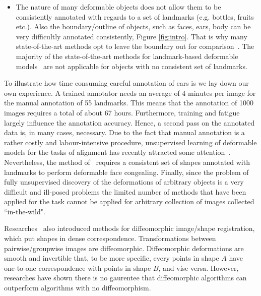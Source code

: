 \begin{itemize}
\item The nature of many deformable objects does not allow them to be consistently annotated with regards to a set of landmarks (e.g. bottles, fruits etc.). Also the boundary/outline of objects, such as faces, ears, body can be very difficultly annotated consistently, Figure \ref{fig:intro}. That is why many state-of-the-art methods opt to leave the boundary out for comparison~\cite{Tzimiropoulos2014, Asthana2014}. The majority of the state-of-the-art methods for landmark-based deformable models~\cite{Cao2012, Zhu2012, Xiong2013, Tzimiropoulos2014, Asthana2014} are not applicable for objects with no consistent set of landmarks. 

\end{itemize}

To illustrate how time consuming careful annotation of ears is we lay down our own experience. A trained annotator needs an average of 4 minutes per image for the manual annotation of 55 landmarks. This means that the annotation of 1000 images requires a total of about 67 hours. 
Furthermore, training and fatigue largely influence the annotation accuracy. Hence, a second pass on the annotated data is, in many cases, necessary. Due to the fact that manual annotation is a rather costly and labour-intensive procedure, unsupervised learning of deformable models for the tasks of alignment has recently attracted some attention~\cite{kokkinos2007unsupervised,jojic2006escaping,jiang2009learning,liu2009simultaneous,baker2004automatic,cox2008least,cootes2004groupwise,frey2003learning}. Nevertheless, the method of~\cite{antonakos2014automatic} requires a consistent set of shapes annotated with landmarks to perform deformable face congealing. Finally, since the problem of fully unsupervised discovery of the deformations of arbitrary objects is a very difficult and ill-posed problems the limited number of methods that have been applied for the task cannot be applied for arbitrary collection of images collected ``in-the-wild". 

Researches~\cite{cootes2004groupwise,cootes2004diffeomorphic,cootes2010computing,rueckert2006diffeomorphic,rueckert1999nonrigid,koelstra2010dynamic} also introduced methods for diffeomorphic image/shape registration, which put shapes in dense correspondence. Transformations between pairwise/groupwise images are diffeomorphic. Diffeomorphic deformations are smooth and invertible that, to be more specific, every points in shape $A$ have one-to-one correspondence with points in shape $B$, and vise versa. However, researches have shown there is no gaurentee that diffeomorphic algorithms can outperform algorithms with no diffeomorphism\cite{crum2004framework}.

